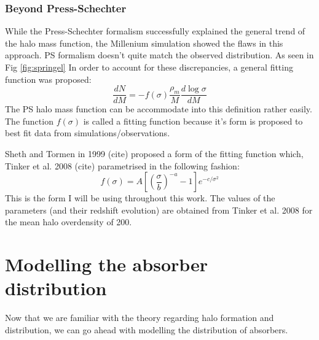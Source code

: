 \documentclass[12pt,a4paper,twoside]{book}
\begin{document}
	 \subsection{Beyond Press-Schechter}
		 	While the Press-Schechter formalism successfully explained the general trend of the halo mass function, the Millenium simulation showed the flaws in this approach. PS formalism doesn't quite match the observed distribution. As seen in Fig \ref{fig:springel}
		 	In order to account for these discrepancies, a general fitting function was proposed:
		 	\begin{equation}
		 		\frac{dN}{dM}=-f(\sigma)\frac{\rho_m}{M}\frac{d\log\sigma}{dM}
		 	\end{equation}
		 	The PS halo mass function can be accommodate into this definition rather easily. The function $f(\sigma)$ is called a fitting function because it's form is proposed to best fit data from simulations/observations.
		 	
		 	Sheth and Tormen in 1999 (cite) proposed a form of the fitting function which, Tinker et al. 2008 (cite) parametrised in the following fashion:
		 	$$
			 	f(\sigma)=A\left[\left(\frac{\sigma}{b}\right)^{-a}-1\right]e^{-c/\sigma^2}
		 	$$
		 	This is the form I will be using throughout this work. The values of the parameters (and their redshift evolution) are obtained from Tinker et al. 2008 for the mean halo overdensity of 200.
\chapter{Modelling the absorber distribution}
 	Now that we are familiar with the theory regarding halo formation and distribution, we can go ahead with modelling the distribution of absorbers.
\end{document}
